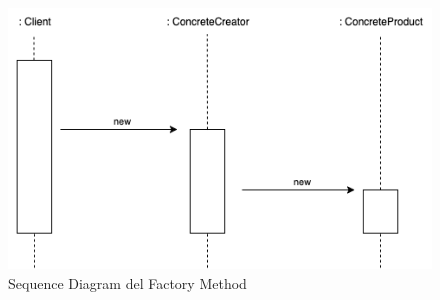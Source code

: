 \begin{figure}[H]
    \centering
    \includegraphics[width=0.8\linewidth]{assets/pattern/factory-method/factory-method-sequence.drawio.png}
    \caption{Sequence Diagram del Factory Method}
\end{figure}

\newpage